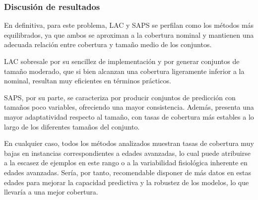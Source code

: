 
\subsubsection{Discusión de resultados}


En definitiva, para este problema, LAC y SAPS se perfilan como los métodos más equilibrados, ya que ambos se aproximan a la cobertura nominal y mantienen una adecuada relación entre cobertura y tamaño medio de los conjuntos.

LAC sobresale por su sencillez de implementación y por generar conjuntos de tamaño moderado, que si bien alcanzan una cobertura ligeramente inferior a la nominal, resultan muy eficientes en términos prácticos.

SAPS, por su parte, se caracteriza por producir conjuntos de predicción con tamaños poco variables, ofreciendo una mayor consistencia. Además, presenta una mayor adaptatividad respecto al tamaño, con tasas de cobertura más estables a lo largo de los diferentes tamaños del conjunto. 

En cualquier caso, todos los métodos analizados muestran tasas de cobertura muy bajas en instancias correspondientes a edades avanzadas, lo cual puede atribuirse a la escasez de ejemplos en este rango o a la variabilidad fisiológica inherente en edades avanzadas. Sería, por tanto, recomendable disponer de más datos en estas edades para mejorar la capacidad predictiva y la robustez de los modelos, lo que llevaría a una mejor cobertura.





